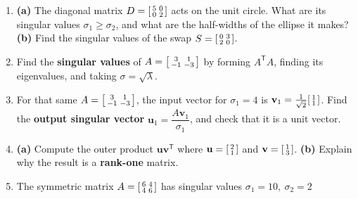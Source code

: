 \documentclass[10pt]{article}
\newcommand{\vv}{\mathbf{v}}
\newcommand{\uu}{\mathbf{u}}
\newcommand{\T}{^{\mathsf T}}
\begin{document}
\begin{enumerate}[leftmargin=1.9em, itemsep=12pt]
  \item \textbf{(a)} The diagonal matrix $D=\begin{bsmallmatrix}5&0\\0&2\end{bsmallmatrix}$ acts on the unit circle.
        What are its singular values $\sigma_1\ge\sigma_2$, and what are the half-widths of the ellipse it makes?
        \textbf{(b)} Find the singular values of the swap $S=\begin{bsmallmatrix}0&3\\2&0\end{bsmallmatrix}$.
        \vspace{2.4cm}
  \item Find the \textbf{singular values} of $A=\begin{bsmallmatrix}3&1\\-1&-3\end{bsmallmatrix}$ by forming
        $A\T A$, finding its eigenvalues, and taking $\sigma=\sqrt{\lambda}$.
        \vspace{2.8cm}
  \item For that same $A=\begin{bsmallmatrix}3&1\\-1&-3\end{bsmallmatrix}$, the input vector for $\sigma_1=4$ is
        $\vv_1=\tfrac{1}{\sqrt2}\begin{bsmallmatrix}1\\1\end{bsmallmatrix}$. Find the \textbf{output singular vector}
        $\uu_1=\dfrac{A\vv_1}{\sigma_1}$, and check that it is a unit vector.
        \vspace{2.8cm}
  \item \textbf{(a)} Compute the outer product $\uu\vv\T$ where $\uu=\begin{bsmallmatrix}2\\1\end{bsmallmatrix}$ and
        $\vv=\begin{bsmallmatrix}1\\3\end{bsmallmatrix}$. \textbf{(b)} Explain why the result is a \textbf{rank-one} matrix.
        \vspace{2.6cm}
  \item The symmetric matrix $A=\begin{bsmallmatrix}6&4\\4&6\end{bsmallmatrix}$ has singular values $\sigma_1=10,\ \sigma_2=2$

\end{enumerate}
\end{document}
